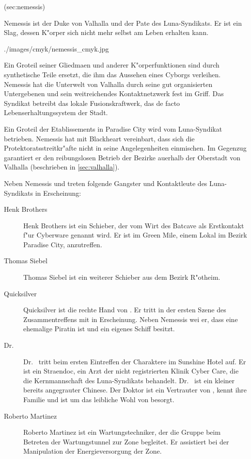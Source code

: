 \anchor(sec:nemessis)

Nemessis ist der Duke von Valhalla und der Pate des Luna-Syndikats. Er ist ein Slag, dessen K"orper sich nicht mehr selbst am Leben erhalten kann.

\begin{sideimagebox}[r]{0.9}{./images/cmyk/nemessis_cmyk.jpg}{}

\end{sideimagebox}

Ein Gro\3teil seiner Gliedma\3en und anderer K"orperfunktionen sind durch synthetische Teile ersetzt, die ihm das Aussehen eines Cyborgs verleihen. Nemessis hat die Unterwelt von Valhalla durch seine gut organisierten Untergebenen und sein weitreichendes Kontaktnetzwerk fest im Griff. Das Syndikat betreibt das lokale Fusionskraftwerk, das de facto Lebenserhaltungssystem der Stadt.

Ein Gro\3teil der Etablissements in Paradise City wird vom Luna-Syndikat betrieben. Nemessis hat mit Blackheart vereinbart, dass sich die Protektoratsstreitkr"afte nicht in seine Angelegenheiten einmischen. Im Gegenzug garantiert er den reibungslosen Betrieb der Bezirke au\3erhalb der Oberstadt von Valhalla (beschrieben in \cref{sec:valhalla}).


Neben Nemessis und \xl{} treten folgende Gangster und Kontaktleute des Luna-Syndikats in Erscheinung:

\begin{description}
    \item [Henk Brothers] Henk Brothers ist ein Schieber, der vom Wirt des Batcave als Erstkontakt f"ur Cyberware genannt wird. Er ist im 
        Green Mile, einem Lokal im Bezirk Paradise City, anzutreffen.
    \item [Thomas Siebel] Thomas Siebel ist ein weiterer Schieber aus dem Bezirk R"otheim.
    \item [Quicksilver] Quicksilver ist die rechte Hand von \xl{}. Er tritt in der ersten Szene des Zusammentreffens mit \xl{} in 
        Erscheinung. Neben Nemessis wei\3 er, dass \xl{} eine ehemalige Piratin ist und ein eigenes Schiff besitzt.
    \item [Dr.~ ] Dr.~  tritt beim ersten Eintreffen der Charaktere im Sunshine Hotel auf. 
        Er ist ein Stra\3endoc, ein Arzt der nicht registrierten Klinik  Cyber Care, die die Kernmannschaft des Luna-Syndikats behandelt. Dr.~  ist ein kleiner bereits angegrauter Chinese. Der Doktor ist ein Vertrauter von \xl{}, kennt ihre Familie und ist um das leibliche Wohl von \xl{} besorgt.
    \item [Roberto Martinez] Roberto Martinez ist ein Wartungstechniker, der die Gruppe beim Betreten der Wartungstunnel zur Zone 
        begleitet. Er assistiert \xl{} bei der Manipulation der Energieversorgung der Zone.
\end{description}
